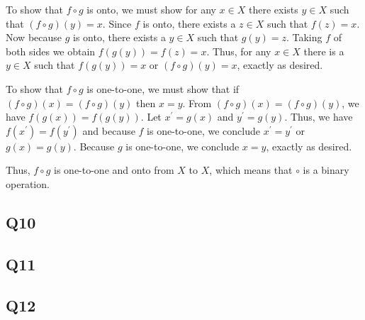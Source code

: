 \documentclass[12pt]{article}
\numberwithin{theorem}{section}
\numberwithin{equation}{section}
\numberwithin{remark}{section}
\numberwithin{definition}{section}
\numberwithin{theorem}{section}
\numberwithin{lemma}{section}
\numberwithin{example}{section}
\begin{document}
To show that $f\circ g$ is onto, we must show for any $x\in X$ there exists $y\in X$ such that $(f\circ g)(y)=x$. Since $f$ is onto, there exists a $z\in X$ such that $f(z)=x$. Now because $g$ is onto, there exists a $y\in X$ such that $g(y)=z$. Taking $f$ of both sides we obtain $f(g(y))=f(z)=x$. Thus, for any $x\in X$ there is a $y\in X$ such that $f(g(y))=x$ or $(f\circ g)(y)=x$, exactly as desired.

To show that $f\circ g$ is one-to-one, we must show that if $(f\circ g)(x)=(f\circ g)(y)$ then $x=y$. From $(f\circ g)(x)=(f\circ g)(y)$, we have $f(g(x))=f(g(y))$. Let $x^\prime=g(x)$ and $y^\prime=g(y)$. Thus, we have $f(x^\prime)=f(y^\prime)$ and because $f$ is one-to-one, we conclude $x^\prime=y^\prime$ or $g(x)=g(y)$. Because $g$ is one-to-one, we conclude $x=y$, exactly as desired. 

Thus, $f\circ g$ is one-to-one and onto from $X$ to $X$, which means that $\circ$ is a binary operation. 



\subsection{Q10}

\subsection{Q11}

\subsection{Q12}

\newpage

\section{}

\newpage

\section{}

\newpage

\section{}

\newpage

\section{}
\end{document}

